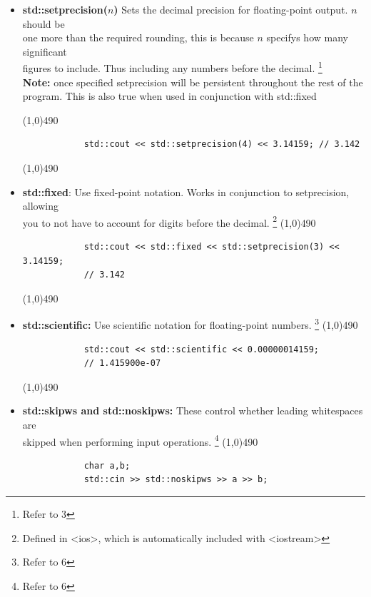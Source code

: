 \documentclass{report}
\begin{document}
\begin{itemize}
        \item \textbf{std::setprecision($n$)} Sets the decimal precision for floating-point output. $n$ should be  \\ one more than the required rounding, this is because $n$ specifys how many significant  \\ figures to include. Thus including any numbers before the decimal. \footnote{Refer to 3} \\
            \textbf{Note:} once specified setprecision will be persistent throughout the rest of the program. This is also true when used in conjunction with std::fixed

            \smallbreak
            \line(1,0){490}
            \begin{verbatim}
            std::cout << std::setprecision(4) << 3.14159; // 3.142
            \end{verbatim}
            \line(1,0){490}
            \pagebreak \bigbreak \noindent 
        \item \textbf{std::fixed}: Use fixed-point notation. Works in conjunction to setprecision, allowing \\ you to not have to account for digits before the decimal.  \footnote{Defined in <ios>, which is automatically included with <iostream>}
            \smallbreak
            \line(1,0){490}
            \begin{verbatim}
            std::cout << std::fixed << std::setprecision(3) << 3.14159; 
            // 3.142
            \end{verbatim}
            \line(1,0){490}
        \item \textbf{std::scientific:} Use scientific notation for floating-point numbers. \footnote{Refer to 6}
            \smallbreak
            \line(1,0){490}
            \begin{verbatim}
            std::cout << std::scientific << 0.00000014159; 
            // 1.415900e-07 
            \end{verbatim}
            \line(1,0){490}
        \item \textbf{std::skipws and std::noskipws:} These control whether leading whitespaces are \\ skipped when performing input operations. \footnote{Refer to 6}
            \smallbreak
            \line(1,0){490}
            \begin{verbatim}
            char a,b;
            std::cin >> std::noskipws >> a >> b;
            \end{verbatim}

\end{itemize}
\end{document}
